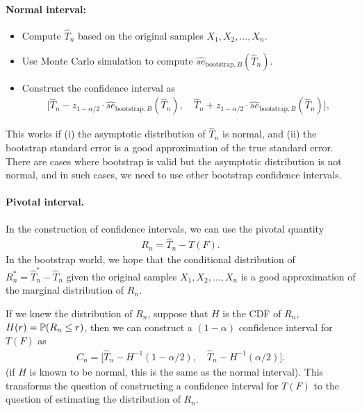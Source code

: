\documentclass[11pt,letterpaper]{article}
\numberwithin{assumption}{lecture}
\numberwithin{theorem}{lecture}
\numberwithin{proposition}{lecture}
\numberwithin{lemma}{lecture}
\numberwithin{claim}{lecture}
\numberwithin{corollary}{lecture}
\numberwithin{definition}{lecture}
\numberwithin{conjecture}{lecture}
\numberwithin{remark}{lecture}
\numberwithin{example}{lecture}
\numberwithin{equation}{lecture}
\begin{document}
\paragraph{Normal interval:}
\begin{itemize}
  \item Compute $\widehat{T}_n$ based on the original samples $X_1, X_2, \ldots, X_n$.
  \item Use Monte Carlo simulation to compute $\widehat{se}_{\mathrm{bootstrap}, B} (\widehat{T}_n)$.
  \item Construct the confidence interval as
  \begin{align*}
    \Big[\widehat{T}_n - z_{1 - \alpha/2} \cdot \widehat{se}_{\mathrm{bootstrap}, B} (\widehat{T}_n), \quad \widehat{T}_n + z_{1 - \alpha/2} \cdot \widehat{se}_{\mathrm{bootstrap}, B} (\widehat{T}_n)\Big],
  \end{align*}
\end{itemize}
This works if (i) the asymptotic distribution of $\widehat{T}_n$ is normal, and (ii) the bootstrap standard error is a good approximation of the true standard error. There are cases where bootstrap is valid but the asymptotic distribution is not normal, and in such cases, we need to use other bootstrap confidence intervals.

\paragraph{Pivotal interval.} In the construction of confidence intervals, we can use the pivotal quantity
\begin{align*}
  R_n = \widehat{T}_n - T(F).
\end{align*}
In the bootstrap world, we hope that the conditional distribution of $R_n^* = \widehat{T}_n^* - \widehat{T}_n$ given the original samples $X_1, X_2, \ldots, X_n$ is a good approximation of the marginal distribution of $R_n$.

If we knew the distribution of $R_n$, suppose that $H$ is the CDF of $R_n$, $H (r) = {\mathbb{P}}(R_n \leq r)$, then we can construct a $(1 - \alpha)$ confidence interval for $T(F)$ as
\begin{align*}
  C_n = \Big[\widehat{T}_n - H^{-1} (1 - \alpha/2), \quad \widehat{T}_n - H^{-1} (\alpha/2)\Big].
\end{align*}
(if $H$ is known to be normal, this is the same as the normal interval). This transforms the question of constructing a confidence interval for $T(F)$ to the question of estimating the distribution of $R_n$.
\end{document}
